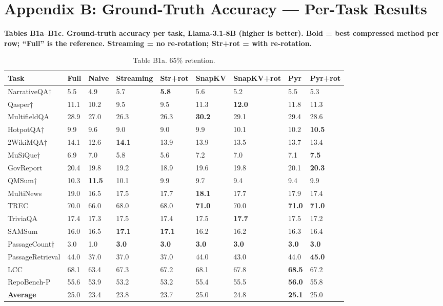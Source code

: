 \documentclass[10pt,letterpaper]{article}
\begin{document}
\clearpage
\hypertarget{appendix-b-ground-truth-accuracy-per-task-results}{%
\section{Appendix B: Ground-Truth Accuracy --- Per-Task
Results}\label{appendix-b-ground-truth-accuracy-per-task-results}}

\textbf{Tables B1a--B1c. Ground-truth accuracy per task, Llama-3.1-8B
(higher is better). Bold = best compressed method per row; ``Full'' is
the reference. Streaming = no re-rotation; Str+rot = with re-rotation.}

\begin{table}[H]
\centering
\small
\caption*{Table B1a. 65\% retention.}
\begin{tabular}{@{}lllllllll@{}}
\toprule
Task & Full & Naive & Streaming & Str+rot & SnapKV & SnapKV+rot & Pyr &
Pyr+rot\\
\midrule
    NarrativeQA† & 5.5 & 4.9 & 5.7 & \textbf{5.8} & 5.6 & 5.2 & 5.5 & 5.3\\
    Qasper† & 11.1 & 10.2 & 9.5 & 9.5 & 11.3 & \textbf{12.0} & 11.8 & 11.3\\
    MultifieldQA & 28.9 & 27.0 & 26.3 & 26.3 & \textbf{30.2} & 29.1 & 29.4 & 28.6\\
    HotpotQA† & 9.9 & 9.6 & 9.0 & 9.0 & 9.9 & 10.1 & 10.2 & \textbf{10.5}\\
    2WikiMQA† & 14.1 & 12.6 & \textbf{14.1} & 13.9 & 13.9 & 13.5 & 13.7 & 13.4\\
    MuSiQue† & 6.9 & 7.0 & 5.8 & 5.6 & 7.2 & 7.0 & 7.1 & \textbf{7.5}\\
    GovReport & 20.4 & 19.8 & 19.2 & 18.9 & 19.6 & 19.8 & 20.1 & \textbf{20.3}\\
    QMSum† & 10.3 & \textbf{11.5} & 10.1 & 9.9 & 9.7 & 9.4 & 9.4 & 9.9\\
    MultiNews & 19.0 & 16.5 & 17.5 & 17.7 & \textbf{18.1} & 17.7 & 17.9 & 17.4\\
    TREC & 70.0 & 66.0 & 68.0 & 68.0 & \textbf{71.0} & 70.0 & \textbf{71.0} & \textbf{71.0}\\
    TriviaQA & 17.4 & 17.3 & 17.5 & 17.4 & 17.5 & \textbf{17.7} & 17.5 & 17.2\\
    SAMSum & 16.0 & 16.5 & \textbf{17.1} & \textbf{17.1} & 16.2 & 16.2 & 16.3 & 16.4\\
    PassageCount† & 3.0 & 1.0 & \textbf{3.0} & \textbf{3.0} & \textbf{3.0} & \textbf{3.0} & \textbf{3.0} & \textbf{3.0}\\
    PassageRetrieval & 44.0 & 37.0 & 37.0 & 37.0 & 44.0 & 43.0 & 44.0 & \textbf{45.0}\\
    LCC & 68.1 & 63.4 & 67.3 & 67.2 & 68.1 & 67.8 & \textbf{68.5} & 67.2\\
    RepoBench-P & 55.6 & 53.9 & 53.2 & 53.2 & 55.4 & 55.5 & \textbf{56.0} & 55.8\\
    \textbf{Average} & 25.0 & 23.4 & 23.8 & 23.7 & 25.0 & 24.8 & \textbf{25.1} & 25.0\\
\bottomrule
\end{tabular}
\end{table}
\end{document}
